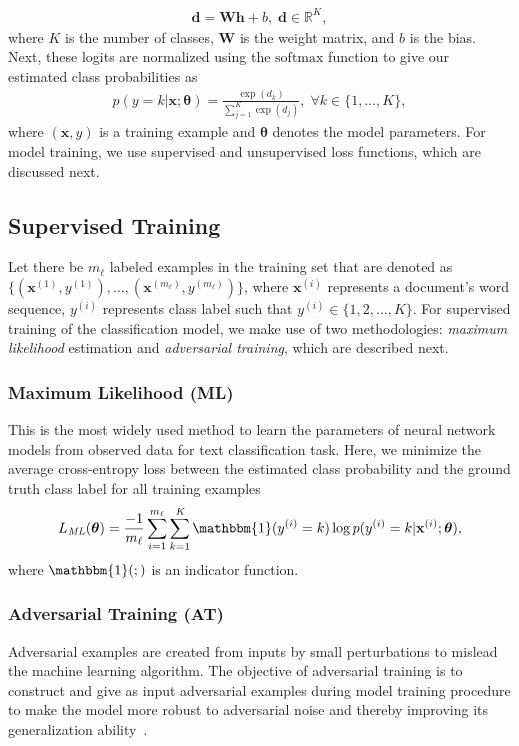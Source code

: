 \documentclass[letterpaper]{article}
\newcommand{\citep}{\cite}
\begin{document}
\begin{align*}
\mathbf{d} = \mathbf{W}\mathbf{h} + b,\;\mathbf{d} \in \mathbb{R}^\textit{K},
\end{align*}
where $\textit{K}$ is the number of classes, $\mathbf{W}$ is the weight matrix, and $b$ is the bias. Next, these logits are normalized using the $\mathrm{softmax}$ function to give our estimated class probabilities as
\begin{align*}
p(y=k|\mathbf{x}; \boldsymbol{\theta}) = \frac{\exp(d_{k})}{\sum_{j=1}^{\textit{K}} \exp(d_{j})},\;\forall{k}\in\{1,\ldots,\textit{K}\},
\end{align*}
where $(\mathbf{x}, y)$ is a training example and $\boldsymbol{\theta}$ denotes the model parameters.
For model training, we use supervised and unsupervised loss functions, which are discussed next.

\subsection{Supervised Training}
Let there be $\textit{m}_\ell$ labeled examples in the training set that are denoted as $\{(\mathbf{x}^{(1)},y^{(1)}),\ldots,(\mathbf{x}^{(\textit{m}_\ell)},y^{(\textit{m}_\ell)})\}$, where $\mathbf{x}^{(i)}$ represents a document's word sequence, $y^{(i)}$ represents class label such that $y^{(i)}\in\{1,2,\ldots,K\}$. For supervised training of the classification model, we make use of two methodologies: \emph{maximum likelihood} estimation and \emph{adversarial training}, which are described next.

\subsubsection*{\textbf{Maximum Likelihood (ML)}} This is the most widely used method to learn the parameters of neural network models from observed data for text classification task. Here, we minimize the average cross-entropy loss between the estimated class probability and the ground truth class label for all training examples
\begin{align*}
L_{\textit{ML}}(\boldsymbol\theta) = \frac{-1}{m_{\ell}}\sum_{i=1}^{m_{\ell}} \sum_{k=1}^{\textit{K}} \mathbbm{1}(y^{(i)}=k)\log{p(y^{(i)}=k|\mathbf{x}^{(i)}; \boldsymbol{\theta})},
\end{align*}
where $\mathbbm{1}(;)$ is an indicator function.

\subsubsection*{\textbf{Adversarial Training (AT)}} Adversarial examples are created from inputs by small perturbations to mislead the machine learning algorithm. The objective of adversarial training is to construct and give as input adversarial examples during model training procedure to make the model more robust to adversarial noise and thereby improving its generalization ability~\citep{goodfellow2014explaining}.
\end{document}
